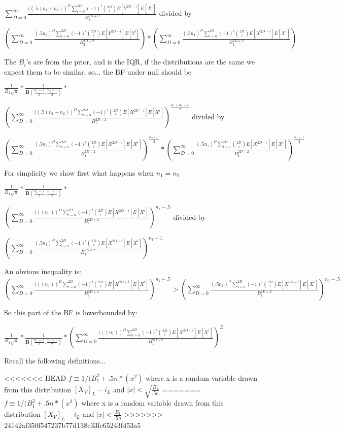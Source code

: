 \documentclass[11pt]{article}
\begin{document}
$\sum_{D=0}^\infty \frac{((.5(n_1 + n_2))^D \sum_{i=0}^{2D} (-1)^i \binom{2D}{i}E[Y^{2D-i}]E[X^{i}]}{B_3^{2D+2}}$ divided by 


$ (\sum_{D=0}^\infty \frac{(.5n_2)^D \sum_{i=0}^{2D} (-1)^i \binom{2D}{i}E[Y^{2D-i}]E[Y^{i}]}{B_2^{2D+2}}) * (\sum_{D=0}^\infty \frac{(.5n_1)^D \sum_{i=0}^{2D} (-1)^i \binom{2D}{i}E[X^{2D-i}]E[X^{i}]}{B_1^{2D+2}}) $

The $B_i$'s are from the prior, and is the IQR, if the distributions are the same we expect them to be similar, so... the BF under null should be

$\frac{1}{B_1 \sqrt{\pi}} * \frac{1}{ \mathbf{B}(\frac{n_1 -1}{2}, \frac{n_2 -1}{2})} * $

$(\sum_{D=0}^\infty \frac{((.5(n_1 + n_2))^D \sum_{i=0}^{2D} (-1)^i \binom{2D}{i}E[X^{2D-i}]E[X^{i}]}{B_1^{2D+2}})^{\frac{n_1+n_2 - 1}{2}}$ divided by 


$ (\sum_{D=0}^\infty \frac{(.5n_2)^D \sum_{i=0}^{2D} (-1)^i \binom{2D}{i}E[X^{2D-i}]E[X^{i}]}{B_1^{2D+2}})^{\frac{n_2 - 1}{2}} * (\sum_{D=0}^\infty \frac{(.5n_1)^D \sum_{i=0}^{2D} \binom{2D}{i}E[X^{2D-i}]E[X^{i}]}{B_1^{2D+2}})^{\frac{n_1 - 1}{2}} $

For simplicity we show first what happens when $n_1 = n_2$

$\frac{1}{B_1 \sqrt{\pi}} * \frac{1}{ \mathbf{B}(\frac{n_1 -1}{2}, \frac{n_1 -1}{2})} * $

$(\sum_{D=0}^\infty \frac{(((n_1))^D \sum_{i=0}^{2D} (-1)^i \binom{2D}{i}E[X^{2D-i}]E[X^{i}]}{B_1^{2D+2}})^{n_1- .5}$ divided by 

$ (\sum_{D=0}^\infty \frac{(.5n_1)^D \sum_{i=0}^{2D} (-1)^i \binom{2D}{i}E[X^{2D-i}]E[X^{i}]}{B_1^{2D+2}})^{n_1- 1} $

An obvious inequality is: $(\sum_{D=0}^\infty \frac{(((n_1))^D \sum_{i=0}^{2D} (-1)^i \binom{2D}{i}E[X^{2D-i}]E[X^{i}]}{B_1^{2D+2}})^{n_1- .5} > (\sum_{D=0}^\infty \frac{(.5n_1)^D \sum_{i=0}^{2D} (-1)^i \binom{2D}{i}E[X^{2D-i}]E[X^{i}]}{B_1^{2D+2}})^{n_1- .5} $

So this part of the BF is lowerbounded by:

$\frac{1}{B_1 \sqrt{\pi}} * \frac{1}{ \mathbf{B}(\frac{n_1 -1}{2}, \frac{n_1 -1}{2})} * (\sum_{D=0}^\infty \frac{(((n_1))^D \sum_{i=0}^{2D} (-1)^i \binom{2D}{i}E[X^{2D-i}]E[X^{i}]}{B_1^{2D+2}})^{.5} $

Recall the following definitions...

<<<<<<< HEAD
$f \equiv 1 / (B_1^2 + .5n*(x^2)$ where x is a random variable drawn from this distribution $[X_V]_{L} - i_L$ and $|x| < \sqrt{\frac{B_1}{.5n}}$  
=======
$f \equiv 1 / (B_1^2 + .5n*(x^2)$ where x is a random variable drawn from this distribution $[X_V]_{L} - i_L$ and $|x| < \frac{B_1}{.5n}$  
>>>>>>> 24142af350f547237b77d138c33fc65243f453a5
\end{document}
